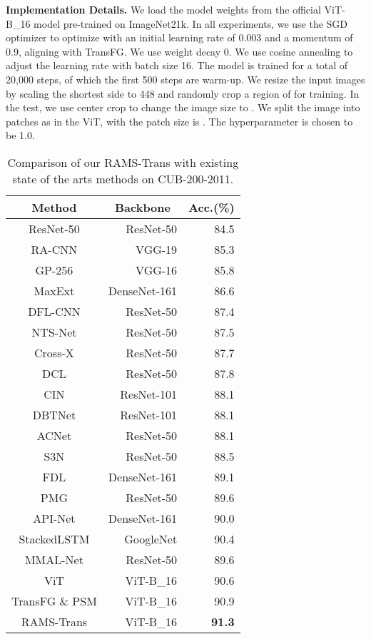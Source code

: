 \documentclass[sigconf]{acmart}
\begin{document}
\textbf{Implementation Details.} We load the model weights from the official ViT-B\_16 model pre-trained on ImageNet21k. In all experiments, we use the SGD optimizer to optimize with an initial learning rate of 0.003 and a momentum of 0.9, aligning with TransFG. We use weight decay 0. We use cosine annealing to adjust the learning rate with batch size 16. The model is trained for a total of 20,000 steps, of which the first 500 steps are warm-up. We resize the input images by scaling the shortest side to 448 and randomly crop a region of  for training. In the test, we use center crop to change the image size to . We split the image into patches as in the ViT, with the patch size is . The hyperparameter  is chosen to be 1.0.

\begin{table}[h]
\caption{Comparison of our RAMS-Trans with existing state of the arts methods on CUB-200-2011.}
\begin{center}
\begin{tabular}{c|rr}
\hline
Method
&\multicolumn{1}{c}{Backbone}
&\multicolumn{1}{c}{Acc.(\%)}
\\
\hline
ResNet-50 \cite{ResNet} & ResNet-50 & 84.5\\
RA-CNN \cite{RA-CNN}& VGG-19 & 85.3\\
GP-256 \cite{GP-256}& VGG-16 & 85.8 \\
MaxExt \cite{MaxEnt}& DenseNet-161 & 86.6\\
DFL-CNN \cite{DFL-CNN}& ResNet-50 & 87.4\\
NTS-Net \cite{NTS-Net}& ResNet-50 & 87.5\\
Cross-X \cite{Cross-X}& ResNet-50 & 87.7\\
DCL \cite{DCL}& ResNet-50 & 87.8\\
CIN \cite{CIN}& ResNet-101 &88.1\\
DBTNet \cite{DBTNet}& ResNet-101 &88.1\\
ACNet \cite{ACNet}& ResNet-50 &88.1 \\
S3N \cite{S3N}& ResNet-50 & 88.5\\
FDL \cite{FDL}& DenseNet-161 & 89.1\\
PMG \cite{PMG}& ResNet-50 & 89.6\\
API-Net \cite{API-Net}& DenseNet-161 & 90.0\\
StackedLSTM \cite{StackedLSTM}& GoogleNet & 90.4\\
MMAL-Net \cite{MMAL-Net}& ResNet-50 & 89.6\\
\hline
ViT  \cite{ViT}& ViT-B\_16 & 90.6\\
TransFG \& PSM \cite{TransFG}& ViT-B\_16 & 90.9\\
RAMS-Trans & ViT-B\_16 & \textbf{91.3}\\
\hline
\end{tabular}
\end{center}
\label{tab_base_model}
\end{table}
\end{document}
